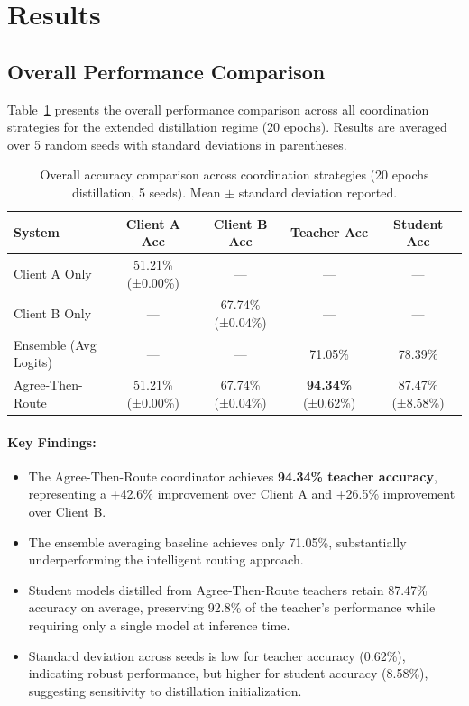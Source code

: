 \documentclass[12pt]{article}
\begin{document}
\section{Results}
\label{sec:results}

\subsection{Overall Performance Comparison}

Table~\ref{tab:overall_results} presents the overall performance comparison across all coordination strategies for the extended distillation regime (20 epochs). Results are averaged over 5 random seeds with standard deviations in parentheses.

\begin{table}[h]
\centering
\caption{Overall accuracy comparison across coordination strategies (20 epochs distillation, 5 seeds). Mean $\pm$ standard deviation reported.}
\label{tab:overall_results}
\begin{tabular}{lcccc}
\toprule
\textbf{System} & \textbf{Client A Acc} & \textbf{Client B Acc} & \textbf{Teacher Acc} & \textbf{Student Acc} \\
\midrule
Client A Only & 51.21\% (±0.00\%) & --- & --- & --- \\
Client B Only & --- & 67.74\% (±0.04\%) & --- & --- \\
\midrule
Ensemble (Avg Logits) & --- & --- & 71.05\% & 78.39\% \\
\midrule
Agree-Then-Route & 51.21\% (±0.00\%) & 67.74\% (±0.04\%) & \textbf{94.34\%} (±0.62\%) & 87.47\% (±8.58\%) \\
\bottomrule
\end{tabular}
\end{table}

\paragraph{Key Findings:}

\begin{itemize}
    \item The Agree-Then-Route coordinator achieves \textbf{94.34\% teacher accuracy}, representing a +42.6\% improvement over Client A and +26.5\% improvement over Client B.
    
    \item The ensemble averaging baseline achieves only 71.05\%, substantially underperforming the intelligent routing approach.
    
    \item Student models distilled from Agree-Then-Route teachers retain 87.47\% accuracy on average, preserving 92.8\% of the teacher's performance while requiring only a single model at inference time.
    
    \item Standard deviation across seeds is low for teacher accuracy (0.62\%), indicating robust performance, but higher for student accuracy (8.58\%), suggesting sensitivity to distillation initialization.
\end{itemize}
\end{document}
